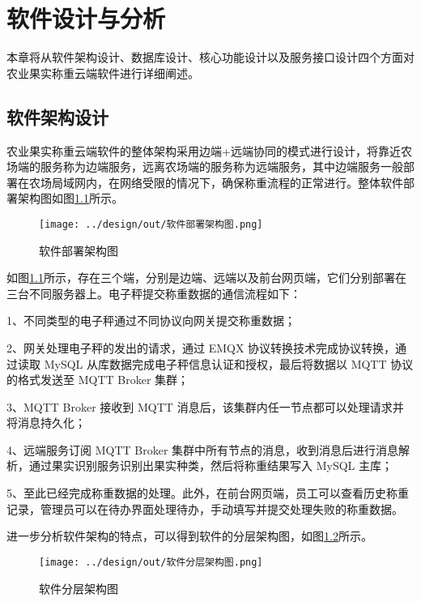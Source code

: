 \chapter{软件设计与分析}

本章将从软件架构设计、数据库设计、核心功能设计以及服务接口设计四个方面对农业果实称重云端软件进行详细阐述。

\section{软件架构设计}\label{sec:architecture}

农业果实称重云端软件的整体架构采用边端+远端协同的模式进行设计，将靠近农场端的服务称为边端服务，远离农场端的服务称为远端服务，其中边端服务一般部署在农场局域网内，在网络受限的情况下，确保称重流程的正常进行。整体软件部署架构图如图\ref{fig:软件部署架构图}所示。

\begin{figure}[H]
    \centering
    \texttt{[image: ../design/out/软件部署架构图.png]}
    \caption{软件部署架构图}
    \label{fig:软件部署架构图}
\end{figure}

如图\ref{fig:软件部署架构图}所示，存在三个端，分别是边端、远端以及前台网页端，它们分别部署在三台不同服务器上。电子秤提交称重数据的通信流程如下：

1、不同类型的电子秤通过不同协议向网关提交称重数据；

2、网关处理电子秤的发出的请求，通过 EMQX 协议转换技术完成协议转换，通过读取 MySQL 从库数据完成电子秤信息认证和授权，最后将数据以 MQTT 协议的格式发送至 MQTT Broker 集群；

3、MQTT Broker 接收到 MQTT 消息后，该集群内任一节点都可以处理请求并将消息持久化；

4、远端服务订阅 MQTT Broker 集群中所有节点的消息，收到消息后进行消息解析，通过果实识别服务识别出果实种类，然后将称重结果写入 MySQL 主库；

5、至此已经完成称重数据的处理。此外，在前台网页端，员工可以查看历史称重记录，管理员可以在待办界面处理待办，手动填写并提交处理失败的称重数据。

进一步分析软件架构的特点，可以得到软件的分层架构图，如图\ref{fig:软件分层架构图}所示。

\begin{figure}[H]
    \centering
    \texttt{[image: ../design/out/软件分层架构图.png]}
    \caption{软件分层架构图}
    \label{fig:软件分层架构图}
\end{figure}

